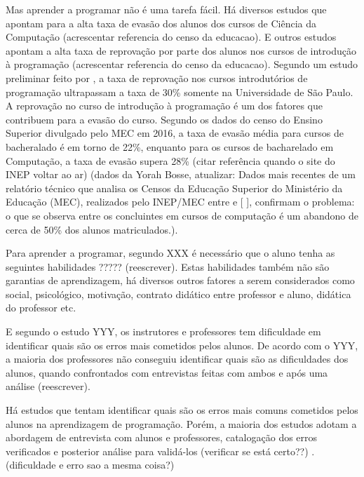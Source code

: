 Mas aprender a programar não é uma tarefa fácil. Há diversos estudos que apontam para a alta taxa de evasão dos alunos dos cursos de Ciência da Computação \citep{Watson:2014:FRI:2591708.2591749} (acrescentar referencia do censo da educacao). E outros estudos apontam a alta taxa de reprovação por parte dos alunos nos cursos de introdução à programação \citep{Watson:2014:FRI:2591708.2591749, bosse:2015:cbie} (acrescentar referencia do censo da educacao). Segundo um estudo preliminar feito por \cite{bosse:2015:cbie}, a taxa de reprovação nos cursos introdutórios de programação ultrapassam a taxa de 30\% somente na Universidade de São Paulo. A reprovação no curso de introdução à programação é um dos fatores que contribuem para a evasão do curso. Segundo os dados do censo do Ensino Superior divulgado pelo MEC em 2016, a taxa de evasão média para cursos de bacheralado é em torno de 22\%, enquanto para os cursos de bacharelado em Computação, a taxa de evasão supera 28\% (citar referência quando o site do INEP voltar ao ar) (dados da Yorah Bosse, atualizar: Dados mais recentes de um relatório técnico que analisa os Censos da Educação Superior do Ministério da Educação (MEC), realizados pelo INEP/MEC entre      e      [  ], confirmam o problema: o que se observa entre os concluintes em cursos de computação é um abandono de cerca de   50\% dos alunos matriculados.).

Para aprender a programar, segundo XXX é necessário que o aluno tenha as seguintes habilidades ????? (reescrever). Estas habilidades também não são garantias de aprendizagem, há diversos outros fatores a serem considerados como social, psicológico, motivação, contrato didático entre professor e aluno, didática do professor etc. 

E segundo o estudo YYY, os instrutores e professores tem dificuldade em identificar quais são os erros mais cometidos pelos alunos. De acordo com o YYY, a maioria dos professores não conseguiu identificar quais são as dificuldades dos alunos, quando confrontados com entrevistas feitas com ambos e após uma análise (reescrever).

Há estudos que tentam identificar quais são os erros mais comuns cometidos pelos alunos na aprendizagem de programação. Porém, a maioria dos estudos adotam a abordagem de entrevista com alunos e professores, catalogação dos erros verificados e posterior análise para validá-los (verificar se está certo??) \cite{Hristova:2003:ICJ:792548.611956}.  (dificuldade e erro sao a mesma coisa?)


